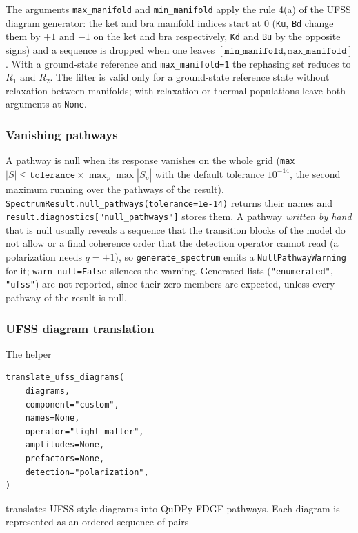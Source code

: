 \documentclass[11pt]{article}
\begin{document}
The arguments \texttt{max\_manifold} and \texttt{min\_manifold} apply the rule 4(a) of the UFSS diagram generator: the ket and bra manifold indices start at $0$ (\texttt{Ku}, \texttt{Bd} change them by $+1$ and $-1$ on the ket and bra respectively, \texttt{Kd} and \texttt{Bu} by the opposite signs) and a sequence is dropped when one leaves $[\texttt{min\_manifold},\texttt{max\_manifold}]$. With a ground-state reference and \texttt{max\_manifold=1} the rephasing set reduces to $R_1$ and $R_2$. The filter is valid only for a ground-state reference state without relaxation between manifolds; with relaxation or thermal populations leave both arguments at \texttt{None}.

\subsubsection{Vanishing pathways}
\label{sec:null-pathways}

A pathway is null when its response vanishes on the whole grid (\texttt{max}$|S|\leq\texttt{tolerance}\times\max_p\max|S_p|$ with the default tolerance $10^{-14}$, the second maximum running over the pathways of the result). \texttt{SpectrumResult.null\_pathways(tolerance=1e-14)} returns their names and \texttt{result.diagnostics["null\_pathways"]} stores them. A pathway \emph{written by hand} that is null usually reveals a sequence that the transition blocks of the model do not allow or a final coherence order that the detection operator cannot read (a polarization needs $q=\pm1$), so \texttt{generate\_spectrum} emits a \texttt{NullPathwayWarning} for it; \texttt{warn\_null=False} silences the warning. Generated lists (\texttt{"enumerated"}, \texttt{"ufss"}) are not reported, since their zero members are expected, unless every pathway of the result is null.

\subsubsection{UFSS diagram translation}

The helper

\begin{verbatim}
translate_ufss_diagrams(
    diagrams,
    component="custom",
    names=None,
    operator="light_matter",
    amplitudes=None,
    prefactors=None,
    detection="polarization",
)
\end{verbatim}

translates UFSS-style diagrams into QuDPy-FDGF pathways. Each diagram is represented as an ordered sequence of pairs
\end{document}
